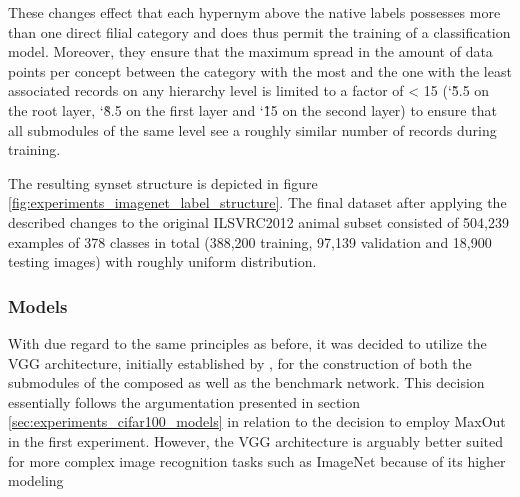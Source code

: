 These changes effect that each hypernym above the native labels possesses more than one direct filial category and does thus permit the training of a classification model. Moreover, they ensure that the maximum spread in the amount of data points per concept between the category with the most and the one with the least associated records on any hierarchy level is limited to a factor of < 15 (\char`\~5.5 on the root layer, \char`\~8.5 on the first layer and \char`\~15 on the second layer) to ensure that all submodules of the same level see a roughly similar number of records during training.

The resulting synset structure is depicted in figure \ref{fig:experiments_imagenet_label_structure}. The final dataset after applying the described changes to the original ILSVRC2012 animal subset consisted of 504,239 examples of 378 classes in total (388,200 training, 97,139 validation and 18,900 testing images) with roughly uniform distribution.
               
\subsubsection{Models%
               \label{sec:experiments_imagenet_models}}
               
With due regard to the same principles as before, it was decided to utilize the VGG architecture, initially established by \cite{Simonyan2014-bt}, for the construction of both the submodules of the composed as well as the benchmark network. This decision essentially follows the argumentation presented in section \ref{sec:experiments_cifar100_models} in relation to the decision to employ MaxOut in the first experiment. However, the VGG architecture is arguably better suited for more complex image recognition tasks such as ImageNet because of its higher modeling

\pagebreak

